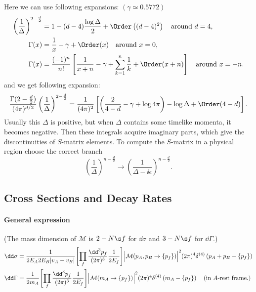 Here we can use following expansions: \qquad $(\gamma\simeq 0.5772)$
\begin{align}
 \left(\frac{1}{\Delta}\right)^{2-\frac d2} &=
 1 - (d-4)\frac{\log\Delta}{2} + \Order\left((d-4)^2\right)\quad\text{around $d=4$},
\\
 \Gamma(x)&=
 \frac{1}{x} - \gamma + \Order(x)\quad\text{around $x=0$},
\\
 \Gamma(x)&=
 \frac{(-1)^n}{n!}\left[ \frac{1}{x+n} - \gamma +
 \sum_{k=1}^{n}\frac{1}{k} + \Order(x+n)\right]
\quad\text{around $x=-n$}.
\end{align}
and we get following expansion:
\begin{equation}
 \frac{\Gamma(2-\frac  d2)}{(4\pi)^{d/2}}\left(\frac1\Delta\right)^{2-\frac d2}
= \frac1{(4\pi)^2}\left[\left(\frac{2}{4-d} - \gamma + \log4\pi \right)
                   - \log \Delta + \Order(4-d) \right].
\end{equation}
Usually this $\Delta$ is positive, but when $\Delta$ contains some
timelike momenta, it becomes negative. Then these integrals acquire
imaginary parts, which give the discontinuities of $S$-matrix elements.
To compute the $S$-matrix in a physical region choose the correct branch
\begin{equation}
 \left(\frac1\Delta\right)^{n-\frac d2}\to
 \left(\frac1{\Delta-\ii\epsilon}\right)^{n-\frac d2}.
\end{equation}


\newpage

\subsection{Cross Sections and Decay Rates}
\paragraph{General expression}
{\small (The mass dimension of $\mathcal M$ is $2-N\s f$ for $\dd\sigma$ and $3-N\s f$ for $\dd\Gamma$.)}
\begin{align}
 \dd\sigma &=
\frac{1}{2E_A2E_B|v_A-v_B|}\Biggl[\prod_f\frac{\dd^3p_f}{(2\pi)^3}\frac{1}{2E_f}\Biggr]
\Bigl|\mathcal M(p_A,p_B\to\{p_f\})\Bigr|^2(2\pi)^4\delta^{(4)}\left(p_A+p_B-\{p_f\}\right)\\
 \dd\Gamma &=
\frac{1}{2m_A}\Biggl[\prod_f\frac{\dd^3p_f}{(2\pi)^3}\frac{1}{2E_f}\Biggr]
\Bigl|\mathcal M(m_A\to\{p_f\})\Bigr|^2(2\pi)^4\delta^{(4)}\left(m_A-\{p_f\}\right)
\quad \text{(in $A$-rest frame.)} 
\end{align}
